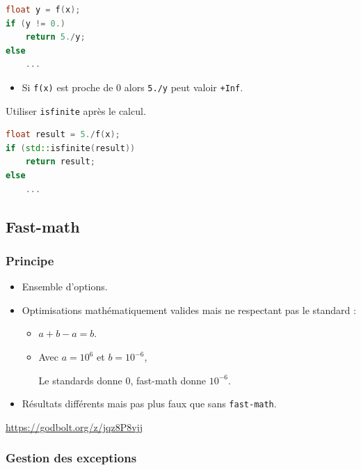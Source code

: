 \documentclass{beamer}
\begin{document}
\begin{frame}[fragile]
    \begin{lstlisting}[language=c++]
float y = f(x);
if (y != 0.)
    return 5./y;
else
    ...
    \end{lstlisting}

    \begin{itemize}
        \item Si \verb'f(x)' est proche de $0$ alors \verb'5./y' peut valoir \verb'+Inf'.
    \end{itemize}
\end{frame}

\begin{frame}[fragile]
    Utiliser \verb'isfinite' après le calcul.

    \begin{lstlisting}[language=c++]
float result = 5./f(x);
if (std::isfinite(result))
    return result;
else
    ...
    \end{lstlisting}
\end{frame}

\subsection{Fast-math}

\begin{frame}[fragile]
    \frametitle{Principe}

    \begin{itemize}
        \item Ensemble d'options.
        \item Optimisations mathématiquement valides mais ne respectant pas le standard :
              \begin{itemize}
                  \item $a+b-a = b$.
                  \item Avec $a = 10^6$ et $b = 10^{-6}$,

                        Le standards donne $0$, fast-math donne $10^{-6}$.
              \end{itemize}
        \item Résultats différents mais pas plus faux que sans \verb'fast-math'.
    \end{itemize}

    \url{https://godbolt.org/z/jqz8P8vjj}
\end{frame}

\subsubsection{Gestion des exceptions}
\end{document}
